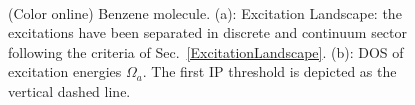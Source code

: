\documentclass[reprint,aps,prb]{revtex4-1}
\begin{document}
\begin{figure}[ht]
\centering
{} \\
\centering
{}
\caption{(Color online) Benzene molecule. (a): Excitation Landscape: the excitations have been separated in discrete and continuum sector following the criteria of Sec.~\ref{ExcitationLandscape}. (b): DOS of excitation energies $\Omega_a$. The first IP threshold is depicted as the vertical dashed line.}
\end{figure}
\end{document}
